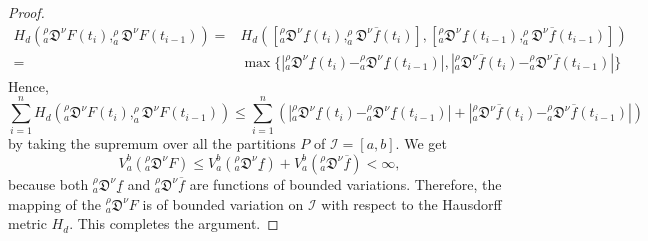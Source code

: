 \documentclass[10pt,a4paper]{amsart}
\begin{document}
\begin{proof}
      \begin{equation*}
          \begin{aligned}
       H_d(_a^\rho\mathfrak{D}^\nu F(t_i),_a^\rho\mathfrak{D}^\nu F(t_{i-1}))=& H_d([_a^\rho\mathfrak{D}^\nu \underline{f}(t_i),_a^\rho\mathfrak{D}^\nu \overline{f}(t_i)],[_a^\rho\mathfrak{D}^\nu \underline{f}(t_{i-1}),_a^\rho\mathfrak{D}^\nu \overline{f}(t_{i-1})]) \\
       =& \max\{|_a^\rho\mathfrak{D}^\nu \underline{f}(t_i)-_a^\rho\mathfrak{D}^\nu \underline{f}(t_{i-1})|,|_a^\rho\mathfrak{D}^\nu \overline{f}(t_i)-_a^\rho\mathfrak{D}^\nu \overline{f}(t_{i-1})| \}
        \end{aligned}
      \end{equation*} 
      Hence, 
      \[ \sum_{i=1}^n H_d(_a^\rho\mathfrak{D}^\nu F(t_i),_a^\rho\mathfrak{D}^\nu F(t_{i-1})) \le \sum_{i=1}^n (|_a^\rho\mathfrak{D}^\nu \underline{f}(t_i)-_a^\rho\mathfrak{D}^\nu \underline{f}(t_{i-1})|+|_a^\rho\mathfrak{D}^\nu \overline{f}(t_i)-_a^\rho\mathfrak{D}^\nu \overline{f}(t_{i-1})| ) \] 
      by taking the supremum over all the partitions $P$ of $\mathcal{I}=[a,b].$ We get 
      \[ V_a^b(_a^\rho\mathfrak{D}^\nu F ) \le V_a^b(_a^\rho\mathfrak{D}^\nu \underline{f}) +V_a^b(_a^\rho\mathfrak{D}^\nu \overline{f})< \infty,\] 
      because both $_a^\rho\mathfrak{D}^\nu \underline{f}$ and $_a^\rho\mathfrak{D}^\nu \overline{f}$ are functions of bounded variations. Therefore, the mapping of the $_a^\rho\mathfrak{D}^\nu F$ is of bounded variation on $\mathcal{I}$ with respect to the Hausdorff metric $H_d.$ This completes the argument.  
 \end{proof}
\end{document}
